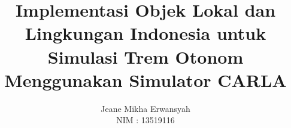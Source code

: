 \documentclass[bahasa, 12pt, a4paper, onecolumn, oneside, final]{report}
\begin{document}
\newcommand{\thedate}{\date{11 Juli 2023}}
\newcommand{\monthyear}{Juli 2023}

\newcommand{\capstonetitle}{Pengembangan Sistem Simulasi \textit{Autonomous Tram} dengan Simulator CARLA}
\newcommand{\thetitle}{Implementasi Objek Lokal dan Lingkungan Indonesia untuk
Simulasi Trem Otonom Menggunakan Simulator CARLA}
\newcommand{\thetitleinenglish}{Implementation of Indonesian Local Objects and
Enviromental Objects for Autonomous Tram Simulation Using CARLA Simulator}

\title{\thetitle}

\newcommand{\subtitle}{
    \bfseries \Large
    Laporan Tugas Akhir - Capstone

    \capstonetitle
}

\newcommand{\authorname}{Jeane Mikha Erwansyah}
\newcommand{\authornim}{13519116}
\author{
    \authorname \\
    NIM : \authornim
}


\newcommand{\advisoronename}{Achmad Imam Kistijantoro, Ph.D.}
\newcommand{\advisoronenip}{197308092006041001}
\newcommand{\advisortwoname}{Prof. Dr. Bambang Riyanto Trilaksono}
\newcommand{\advisortwonip}{196211151987031004}
\newcommand{\advisorapproval}{
    \centering
    \normalsize \normalfont

    \vspace{0.5cm}
    \setlength{\tabcolsep}{12pt}
    \begin{tabular}{c@{\hskip 0.5cm}c}
        Pembimbing I,               & Pembimbing II,             \\
                                    &                            \\
                                    &                            \\
                                    &                            \\
                                    &                            \\
        \underline{\advisoronename} & \underline{\advisortwoname} \\
        NIP. \advisoronenip     & NIP. \advisortwonip     \\
    \end{tabular}
    }
\end{document}
